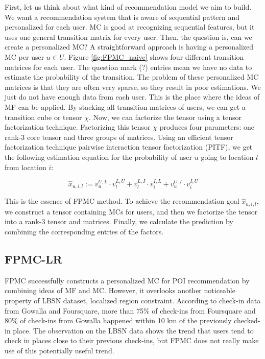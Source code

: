 \documentclass{sig-alternate}
\begin{document}
First, let us think about what kind of recommendation model we aim to build. 
We want a recommendation system that is aware of sequential pattern and personalized for each user.
MC is good at recognizing sequential features, but it uses one general transition matrix for every user. 
Then, the question is, can we create a personalized MC?
A straightforward approach is having a personalized MC per user $u \in U$. 
Figure \ref{fig:FPMC_naive} shows four different transition matrices for each user. 
The question mark (?) entries mean we have no data to estimate the probability of the transition. The problem of these personalized 
MC matrices is that they are often very sparse, so they result in poor estimations. We just do not have enough data from
each user. This is the place where the ideas of MF can be applied. By stacking all transition matrices of users, 
we can get a transition cube or tensor $\chi$. Now, we can factorize the tensor using a tensor factorization technique. 
Factorizing this tensor $\chi$ produces four parameters: one rank-3 core tensor and three groups of matrices. Using an efficient tensor 
factorization technique pairwise interaction tensor factorization (PITF), we get the following 
estimation equation for the probability of user $u$ going to location $l$ from location $i$:

\begin{equation}
	\hat{x}_{u,i,l} := v_u^{U,L} \cdot v_l^{L,U} + v_l^{L,I} \cdot v_i^{I,L} + v_u^{U,I} \cdot v_i^{I,U}
\label{eq:MF}
\end{equation}

This is the essence of FPMC method. To achieve the recommendation goal $\hat{x}_{u,i,l}$, we 
construct a tensor containing MCs for users, and then we factorize the tensor into a rank-3 tensor 
and matrices. Finally, we calculate the prediction by combining the corresponding entries of the
factors. 

\subsection{FPMC-LR}
\label{sec:typeChangesSpecialChars}

FPMC successfully constructs a personalized MC for POI recommendation
by combining ideas of MF and MC. However, it overlooks another noticeable property 
of LBSN dataset, localized region constraint. According to check-in data from 
Gowalla and Foursquare, more than 75\% of check-ins from Foursquare and 80\% of check-ins 
from Gowalla happened within 10 km of the previously checked-in place. The observation on the LBSN data
shows the trend that users tend to check in places close to their previous check-ins, 
but FPMC does not really make use of this potentially useful trend.
\end{document}
